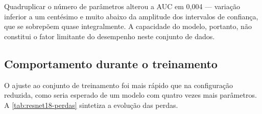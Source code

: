 Quadruplicar o número de parâmetros alterou a \gls{AUC} em 0,004 --- variação
inferior a um centésimo e muito abaixo da amplitude dos intervalos de
confiança, que se sobrepõem quase integralmente. A capacidade do modelo,
portanto, não constitui o fator limitante do desempenho neste conjunto de
dados.

\subsection{Comportamento durante o treinamento}
\label{subsec:treinamento-resnet18}

O ajuste ao conjunto de treinamento foi mais rápido que na configuração
reduzida, como seria esperado de um modelo com quatro vezes mais parâmetros.
A \autoref{tab:resnet18-perdas} sintetiza a evolução das perdas.

\begin{table}[h!]
	\captionsetup{width=14cm}
\end{table}

